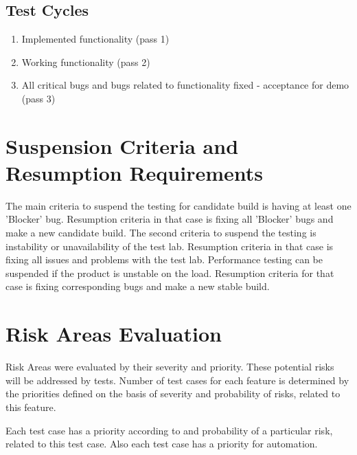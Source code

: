 \documentclass[a4paper,11pt]{article}
\begin{document}
\subsection{Test Cycles}
\begin{enumerate}
\item Implemented functionality (pass 1)
\item Working functionality (pass 2)
\item All critical bugs and bugs related to functionality fixed - acceptance for demo (pass 3)
\end{enumerate}





\section{Suspension Criteria and Resumption Requirements}

The main criteria to suspend the testing for candidate build is having at least one 'Blocker' bug. Resumption criteria in that case is fixing all 'Blocker' bugs and make a new candidate build.
The second criteria to suspend the testing is instability or unavailability of the test lab. Resumption criteria in that case is fixing all issues and problems with the test lab.
Performance testing can be suspended if the product is unstable on the load. Resumption criteria for that case is fixing corresponding bugs and make a new stable build.






\section{Risk Areas Evaluation}

Risk Areas were evaluated by their severity and priority. These potential risks will be addressed by tests. Number of test cases for each feature is determined by the priorities defined on the basis of severity and probability of risks, related to this feature.

Each test case has a priority according to and probability of a particular risk, related to this test case. Also each test case has a priority for automation.
\end{document}

